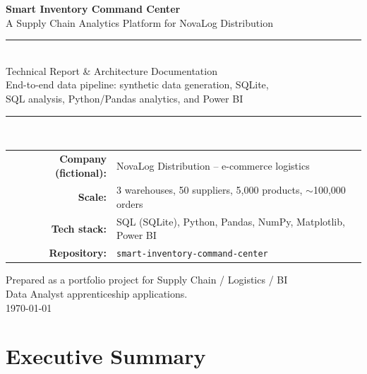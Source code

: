 \documentclass[11pt,a4paper]{report}
\begin{document}
\begin{titlepage}
\centering
\vspace*{2cm}

{\Huge\bfseries\color{navy} Smart Inventory Command Center}\\[0.6cm]
{\Large A Supply Chain Analytics Platform for NovaLog Distribution}\\[1.5cm]

\rule{0.6\textwidth}{0.6pt}\\[0.5cm]
{\large Technical Report \& Architecture Documentation}\\[0.3cm]
{\normalsize End-to-end data pipeline: synthetic data generation, SQLite,\\
SQL analysis, Python/Pandas analytics, and Power BI}\\[1.5cm]
\rule{0.6\textwidth}{0.6pt}\\[2cm]

\begin{tabular}{rl}
\textbf{Company (fictional):} & NovaLog Distribution -- e-commerce logistics \\[4pt]
\textbf{Scale:} & 3 warehouses, 50 suppliers, 5{,}000 products, $\sim$100{,}000 orders \\[4pt]
\textbf{Tech stack:} & SQL (SQLite), Python, Pandas, NumPy, Matplotlib, Power BI \\[4pt]
\textbf{Repository:} & \texttt{smart-inventory-command-center} \\[4pt]
\end{tabular}

\vfill

{\normalsize Prepared as a portfolio project for Supply Chain / Logistics / BI\\
Data Analyst apprenticeship applications.}\\[0.5cm]
{\normalsize \today}

\end{titlepage}

\tableofcontents
\listoffigures
\clearpage

\chapter{Executive Summary}
\end{document}

